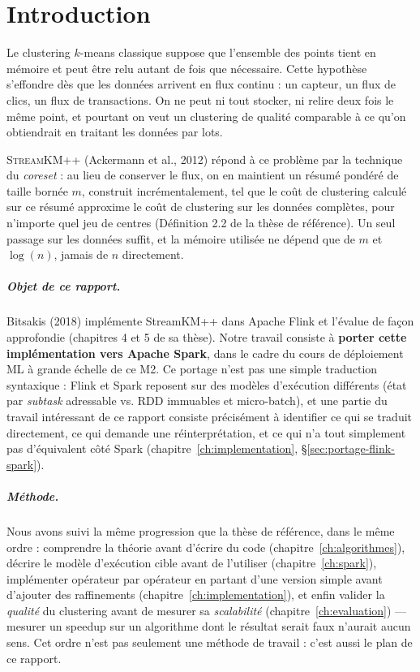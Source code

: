 \chapter{Introduction}
\label{ch:introduction}

Le clustering $k$-means classique suppose que l'ensemble des points tient en
mémoire et peut être relu autant de fois que nécessaire. Cette hypothèse
s'effondre dès que les données arrivent en flux continu : un capteur, un
flux de clics, un flux de transactions. On ne peut ni tout stocker, ni
relire deux fois le même point, et pourtant on veut un clustering de qualité
comparable à ce qu'on obtiendrait en traitant les données par lots.

\textsc{StreamKM++} (Ackermann et al., 2012) répond à ce problème par la
technique du \emph{coreset} : au lieu de conserver le flux, on en maintient
un résumé pondéré de taille bornée $m$, construit incrémentalement, tel que
le coût de clustering calculé sur ce résumé approxime le coût de clustering
sur les données complètes, pour n'importe quel jeu de centres (Définition 2.2
de la thèse de référence). Un seul passage sur les données suffit, et la
mémoire utilisée ne dépend que de $m$ et $\log(n)$, jamais de $n$
directement.

\paragraph{Objet de ce rapport.} Bitsakis (2018) implémente StreamKM++ dans
Apache Flink et l'évalue de façon approfondie (chapitres 4 et 5 de sa
thèse). Notre travail consiste à \textbf{porter cette implémentation vers
Apache Spark}, dans le cadre du cours de déploiement ML à grande échelle de
ce M2. Ce portage n'est pas une simple traduction syntaxique : Flink et
Spark reposent sur des modèles d'exécution différents (état par
\emph{subtask} adressable vs. RDD immuables et micro-batch), et une partie
du travail intéressant de ce rapport consiste précisément à identifier ce
qui se traduit directement, ce qui demande une réinterprétation, et ce qui
n'a tout simplement pas d'équivalent côté Spark (chapitre~\ref{ch:implementation},
§\ref{sec:portage-flink-spark}).

\paragraph{Méthode.} Nous avons suivi la même progression que la thèse de
référence, dans le même ordre : comprendre la théorie avant d'écrire du
code (chapitre~\ref{ch:algorithmes}), décrire le modèle d'exécution cible
avant de l'utiliser (chapitre~\ref{ch:spark}), implémenter opérateur par
opérateur en partant d'une version simple avant d'ajouter des raffinements
(chapitre~\ref{ch:implementation}), et enfin valider la \emph{qualité} du
clustering avant de mesurer sa \emph{scalabilité}
(chapitre~\ref{ch:evaluation}) --- mesurer un speedup sur un algorithme dont
le résultat serait faux n'aurait aucun sens. Cet ordre n'est pas seulement
une méthode de travail : c'est aussi le plan de ce rapport.

